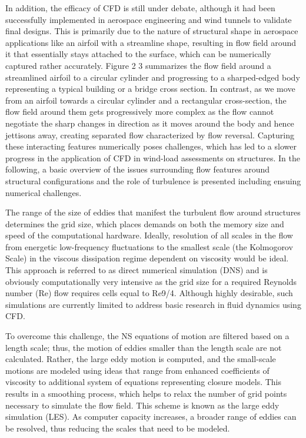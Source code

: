 In addition, the efficacy of CFD is still under debate, although it had been successfully implemented in aerospace engineering and wind tunnels to validate final designs. This is primarily due to the nature of structural shape in aerospace applications like an airfoil with a streamline shape, resulting in flow field around it that essentially stays attached to the surface, which can be numerically captured rather accurately.
Figure 2 3 summarizes the flow field around a streamlined airfoil to a circular cylinder and progressing to a sharped-edged body representing a typical building or a bridge cross section. In contrast, as we move from an airfoil towards a circular cylinder and a rectangular cross-section, the flow field around them gets progressively more complex as the flow cannot negotiate the sharp changes in direction as it moves around the body and hence jettisons away, creating separated flow characterized by flow reversal. Capturing these interacting features numerically poses challenges, which has led to a slower progress in the application of CFD in wind-load assessments on structures. In the following, a basic overview of the issues surrounding flow features around structural configurations and the role of turbulence is presented including ensuing numerical challenges. 

The range of the size of eddies that manifest the turbulent flow around structures determines the grid size, which places demands on both the memory size and speed of the computational hardware. Ideally, resolution of all scales in the flow from energetic low-frequency fluctuations to the smallest scale (the Kolmogorov Scale) in the viscous dissipation regime dependent on viscosity would be ideal. This approach is referred to as direct numerical simulation (DNS) and is obviously computationally very intensive as the grid size for a required Reynolds number (Re) flow requires cells equal to Re9/4. Although highly desirable, such simulations are currently limited to address basic research in fluid dynamics using CFD. 

To overcome this challenge, the NS equations of motion are filtered based on a length scale; thus, the motion of eddies smaller than the length scale are not calculated. Rather, the large eddy motion is computed, and the small-scale motions are modeled using ideas that range from enhanced coefficients of viscosity to additional system of equations representing closure models. This results in a smoothing process, which helps to relax the number of grid points necessary to simulate the flow field. This scheme is known as the large eddy simulation (LES). As computer capacity increases, a broader range of eddies can be resolved, thus reducing the scales that need to be modeled. 

